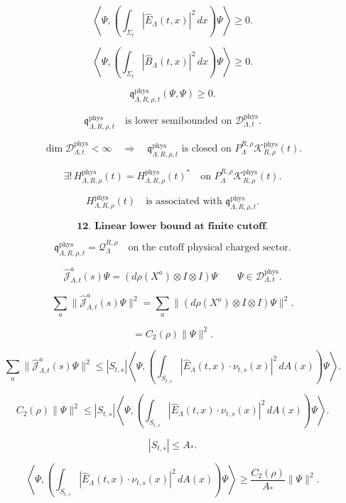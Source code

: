 \documentclass[11pt]{article}
\begin{document}
\[
\left\langle
\Psi,
\left(
\int_{\Sigma_t}
|\widehat E_\Lambda(t,x)|^2\,dx
\right)\Psi
\right\rangle
\ge0.
\]

\[
\left\langle
\Psi,
\left(
\int_{\Sigma_t}
|\widehat B_\Lambda(t,x)|^2\,dx
\right)\Psi
\right\rangle
\ge0.
\]

\[
\mathfrak q_{\Lambda,R,\rho,t}^{\mathrm{phys}}(\Psi,\Psi)
\ge0.
\]

\[
\mathfrak q_{\Lambda,R,\rho,t}^{\mathrm{phys}}
\quad
\text{is lower semibounded on }
\mathscr D_{\Lambda,t}^{\mathrm{phys}}.
\]

\[
\dim\mathscr D_{\Lambda,t}^{\mathrm{phys}}<\infty
\quad\Longrightarrow\quad
\mathfrak q_{\Lambda,R,\rho,t}^{\mathrm{phys}}
\text{ is closed on }
P_\Lambda^{R,\rho}\mathcal K_{R,\rho}^{\mathrm{phys}}(t).
\]

\[
\exists!\,
H_{\Lambda,R,\rho}^{\mathrm{phys}}(t)
=
H_{\Lambda,R,\rho}^{\mathrm{phys}}(t)^\ast
\quad
\text{on }
P_\Lambda^{R,\rho}\mathcal K_{R,\rho}^{\mathrm{phys}}(t).
\]

\[
H_{\Lambda,R,\rho}^{\mathrm{phys}}(t)
\quad
\text{is associated with }
\mathfrak q_{\Lambda,R,\rho,t}^{\mathrm{phys}}.
\]

\bigskip

\[
\textbf{12. Linear lower bound at finite cutoff.}
\]

\[
\mathfrak q_{\Lambda,R,\rho,t}^{\mathrm{phys}}
=
\mathcal Q_{\Lambda}^{R,\rho}
\quad
\text{on the cutoff physical charged sector}.
\]

\[
\widehat{\mathcal J}_{\Lambda,t}^a(s)\Psi
=
(d\rho(X^a)\otimes I\otimes I)\Psi
\qquad
\Psi\in \mathscr D_{\Lambda,t}^{\mathrm{phys}}.
\]

\[
\sum_a
\|\widehat{\mathcal J}_{\Lambda,t}^a(s)\Psi\|^2
=
\sum_a
\|(d\rho(X^a)\otimes I\otimes I)\Psi\|^2.
\]

\[
=
C_2(\rho)\|\Psi\|^2.
\]

\[
\sum_a
\|\widehat{\mathcal J}_{\Lambda,t}^a(s)\Psi\|^2
\le
|S_{t,s}|
\left\langle
\Psi,
\left(
\int_{S_{t,s}}
|\widehat E_\Lambda(t,x)\cdot\nu_{t,s}(x)|^2\,dA(x)
\right)\Psi
\right\rangle.
\]

\[
C_2(\rho)\|\Psi\|^2
\le
|S_{t,s}|
\left\langle
\Psi,
\left(
\int_{S_{t,s}}
|\widehat E_\Lambda(t,x)\cdot\nu_{t,s}(x)|^2\,dA(x)
\right)\Psi
\right\rangle.
\]

\[
|S_{t,s}|\le A_\ast.
\]

\[
\left\langle
\Psi,
\left(
\int_{S_{t,s}}
|\widehat E_\Lambda(t,x)\cdot\nu_{t,s}(x)|^2\,dA(x)
\right)\Psi
\right\rangle
\ge
\frac{C_2(\rho)}{A_\ast}\|\Psi\|^2.
\]
\end{document}
